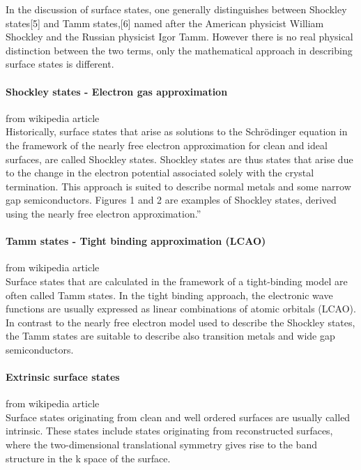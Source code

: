 In the discussion of surface states, one generally distinguishes between Shockley states[5] and Tamm states,[6] named after the American physicist William Shockley and the Russian physicist Igor Tamm. However there is no real physical distinction between the two terms, only the mathematical approach in describing surface states is different. 

\paragraph{Shockley states - Electron gas approximation} from wikipedia article \\
Historically, surface states that arise as solutions to the Schr\"odinger equation
in the framework of the nearly free electron approximation for clean and ideal surfaces, are called Shockley states. Shockley states are thus states that arise due to the change in the electron potential associated solely with the crystal termination. This approach is suited to describe normal metals and some narrow gap semiconductors. Figures 1 and 2 are examples of Shockley states, derived using the nearly free electron approximation.''

\paragraph{Tamm states - Tight binding approximation (LCAO)} from wikipedia article \\
Surface states that are calculated in the framework of a tight-binding model are often called Tamm states. In the tight binding approach, the electronic wave functions are usually expressed as linear combinations of atomic orbitals (LCAO). In contrast to the nearly free electron model used to describe the Shockley states, the Tamm states are suitable to describe also transition metals and wide gap semiconductors.

\paragraph{Extrinsic surface states} from wikipedia article \\
Surface states originating from clean and well ordered surfaces are usually called intrinsic. These states include states originating from reconstructed surfaces, where the two-dimensional translational symmetry gives rise to the band structure in the k space of the surface.

